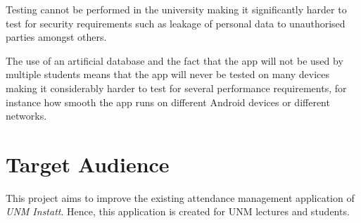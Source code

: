 \documentclass[../report.tex]{subfiles}
\begin{document}
Testing cannot be performed in the university making it significantly harder to test for security requirements such as leakage of personal data to unauthorised parties amongst others. 

The use of an artificial database and the fact that the app will not be used by multiple students means that the app will never be tested on many devices making it considerably harder to test for several performance requirements, for instance how smooth the app runs on different Android devices or different networks.

\section{Target Audience}
This project aims to improve the existing attendance management application of \textit{UNM Instatt}. Hence, this application is created for UNM lectures and students.
\end{document}

